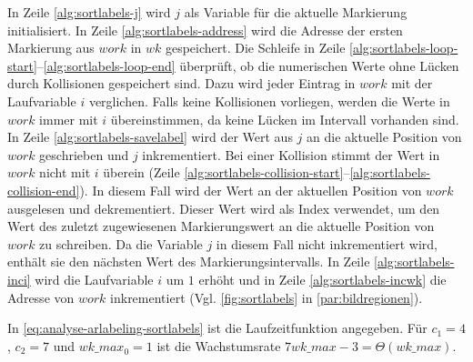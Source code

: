 In Zeile \ref{alg:sortlabels-j} wird $j$ als Variable für die aktuelle Markierung initialisiert. In Zeile
 \ref{alg:sortlabels-address} wird die Adresse der ersten Markierung aus $\mathit{work}$ in $\mathit{wk}$ gespeichert.
 Die Schleife in Zeile \ref{alg:sortlabels-loop-start}--\ref{alg:sortlabels-loop-end} überprüft, ob die numerischen
 Werte ohne Lücken durch Kollisionen gespeichert sind. Dazu wird jeder Eintrag in $\mathit{work}$ mit der Laufvariable
 $i$ verglichen. Falls keine Kollisionen vorliegen, werden die Werte in $\mathit{work}$ immer mit $i$ übereinstimmen,
 da keine Lücken im Intervall vorhanden sind. In Zeile \ref{alg:sortlabels-savelabel} wird der Wert aus $j$ an die
 aktuelle Position von $\mathit{work}$ geschrieben und $j$ inkrementiert. Bei einer Kollision stimmt der Wert in
 $\mathit{work}$ nicht mit $i$ überein
 (Zeile \ref{alg:sortlabels-collision-start}--\ref{alg:sortlabels-collision-end}). In diesem Fall wird der Wert an der
 aktuellen Position von $\mathit{work}$ ausgelesen und dekrementiert. Dieser Wert wird als Index verwendet, um den Wert
 des zuletzt zugewiesenen Markierungswert an die aktuelle Position von $\mathit{work}$ zu schreiben. Da die Variable
 $j$ in diesem Fall nicht inkrementiert wird, enthält sie den nächsten Wert des Markierungsintervalls. In Zeile
 \ref{alg:sortlabels-inci} wird die Laufvariable $i$ um $1$ erhöht und in Zeile \ref{alg:sortlabels-incwk} die Adresse
 von $\mathit{work}$ inkrementiert (Vgl. \autoref{fig:sortlabels} in \autoref{par:bildregionen}).

In \autoref{eq:analyse-arlabeling-sortlabels} ist die Laufzeitfunktion angegeben. Für $c_{1} = 4$, $c_{2} = 7$ und
 $\mathit{wk\_max}_{0} = 1$ ist die Wachstumsrate $7\mathit{wk\_max} - 3 = \Theta(\mathit{wk\_max})$.

